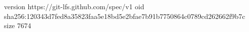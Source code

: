 version https://git-lfs.github.com/spec/v1
oid sha256:120343d7fed8a35823faa5e18bd5e2bfae7b91b7750864c0789cd262662f9b7c
size 7674
